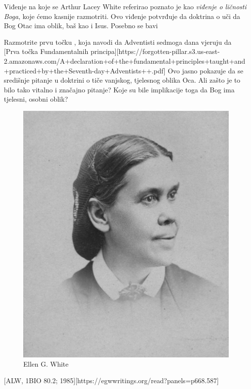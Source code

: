 Viđenje na koje se Arthur Lacey White referirao poznato je kao \textit{viđenje o ličnosti Boga}, koje ćemo kasnije razmotriti. Ovo viđenje potvrđuje da doktrina o  uči da Bog Otac ima oblik, baš kao i Isus. Posebno se bavi 

Razmotrite prvu točku , koja navodi da Adventisti sedmoga dana vjeruju da [Prva točka Fundamentalnih principa][https://forgotten-pillar.s3.us-east-2.amazonaws.com/A+declaration+of+the+fundamental+principles+taught+and+practiced+by+the+Seventh-day+Adventists++.pdf] Ovo jasno pokazuje da se središnje pitanje u doktrini o  tiče vanjskog, tjelesnog oblika Oca. Ali zašto je to bilo tako vitalno i značajno pitanje? Koje su bile implikacije toga da Bog ima tjelesni, osobni oblik?

\begin{figure}[t]
    \centering
    \includegraphics[width=0.65\linewidth]{images/ellen-white.jpg}
    \caption*{Ellen G. White}
    \label{fig:ellen-g-white}
\end{figure}

[ALW, 1BIO 80.2; 1985][https://egwwritings.org/read?panels=p668.587]

